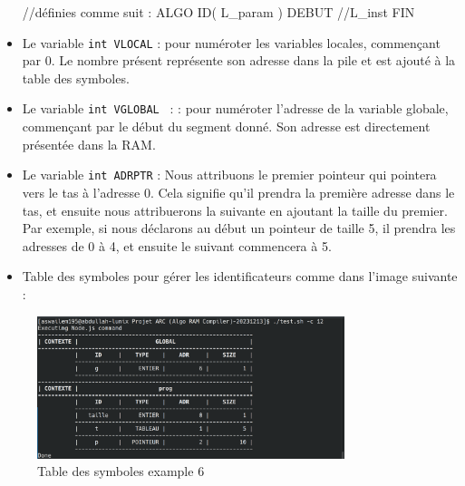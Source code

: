 \documentclass[a4paper,10pt]{article}
\begin{document}
\begin{itemize}
            \begin{algo}
            //définies comme suit :
            ALGO ID( L_param )
            DEBUT
                //L_inst
            FIN

            \end{algo}
    \item Le variable  \texttt{int VLOCAL} : pour numéroter les variables locales, commençant par 0. Le nombre présent représente son adresse dans la pile et est ajouté à la table des symboles.
    \item Le variable  \texttt{int VGLOBAL } : : pour numéroter l'adresse de la variable globale, commençant par le début du segment donné. Son adresse est directement présentée dans la RAM.
    \item Le variable  \texttt{int ADRPTR} :  Nous attribuons le premier pointeur qui pointera vers le tas à l'adresse 0. Cela signifie qu'il prendra la première adresse dans le tas, et ensuite nous attribuerons la suivante en ajoutant la taille du premier. Par exemple, si nous déclarons au début un pointeur de taille 5, il prendra les adresses de 0 à 4, et ensuite le suivant commencera à 5.
    \item Table des symboles pour gérer les identificateurs comme dans l'image suivante  :
\end{itemize}
\begin{figure}[H]
    \centering
    \includegraphics[width=0.8\textwidth]{ts.png}
    \caption{Table des symboles example 6 }
    \label{fig:asa_structure}
\end{figure}
\end{document}
